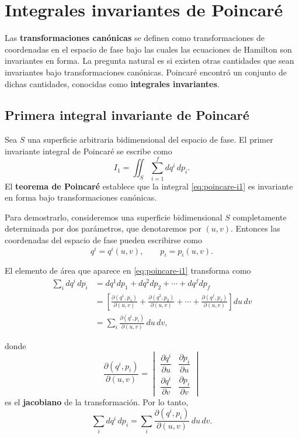 \documentclass[../apunte_mecanica_clasica.tex]{subfiles}
\begin{document}
\chapter{Integrales invariantes de Poincaré}
\label{ch:integrales-invariantes}

Las \textbf{transformaciones canónicas} se definen como transformaciones de coordenadas en el espacio de fase bajo las cuales las ecuaciones de Hamilton son invariantes en forma. La pregunta natural es si existen otras cantidades que sean invariantes bajo transformaciones canónicas. Poincaré encontró un conjunto de dichas cantidades, conocidas como \textbf{integrales invariantes}.

\section{Primera integral invariante de Poincaré}

Sea $S$ una superficie arbitraria bidimensional del espacio de fase. El primer invariante integral de Poincaré se escribe como
\begin{equation}
    I_1 = \iint_S \sum_{i=1}^{f} dq^i\,dp_i .
    \label{eq:poincare-i1}
\end{equation}
El \textbf{teorema de Poincaré} establece que la integral \eqref{eq:poincare-i1} es invariante en forma bajo transformaciones canónicas.

Para demostrarlo, consideremos una superficie bidimensional $S$ completamente determinada por dos parámetros, que denotaremos por $(u,v)$. Entonces las coordenadas del espacio de fase pueden escribirse como
\begin{equation}
    q^i=q^i(u,v),
    \qquad
    p_i=p_i(u,v).
    \label{eq:parametrizacion-superficie-fase}
\end{equation}

El elemento de área que aparece en \eqref{eq:poincare-i1} transforma como
\begin{align}
    \sum_i dq^i\,dp_i
    &= dq^1dp_1+dq^2dp_2+\cdots+dq^f dp_f \\
    &= \left[
    \frac{\partial(q^1,p_1)}{\partial(u,v)}+
    \frac{\partial(q^2,p_2)}{\partial(u,v)}+
    \cdots+
    \frac{\partial(q^f,p_f)}{\partial(u,v)}
    \right]du\,dv \\
    &= \sum_i \frac{\partial(q^i,p_i)}{\partial(u,v)}\,du\,dv,
    \label{eq:elemento-area-jacobiano}
\end{align}

donde
\begin{equation}
    \frac{\partial(q^i,p_i)}{\partial(u,v)}
    =
    \begin{vmatrix}
        \dfrac{\partial q^i}{\partial u} & \dfrac{\partial p_i}{\partial u} \\
        \dfrac{\partial q^i}{\partial v} & \dfrac{\partial p_i}{\partial v}
    \end{vmatrix}
    \label{eq:jacobiano-qi-pi}
\end{equation}
es el \textbf{jacobiano} de la transformación. Por lo tanto,
\begin{equation}
    \sum_i dq^i\,dp_i
    =
    \sum_i \frac{\partial(q^i,p_i)}{\partial(u,v)}\,du\,dv.
    \label{eq:i1-parametrizado-qp}
\end{equation}
\end{document}
